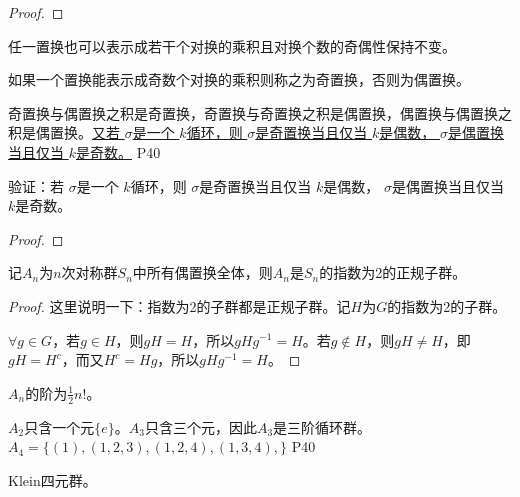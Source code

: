 \begin{proof}
	
\end{proof}

\begin{corollary}
	任一置换也可以表示成若干个对换的乘积且对换个数的奇偶性保持不变。
\end{corollary}

\begin{definition}
	如果一个置换能表示成奇数个对换的乘积则称之为奇置换，否则为偶置换。
\end{definition}

\original
{
	奇置换与偶置换之积是奇置换，奇置换与奇置换之积是偶置换，偶置换与偶置换之积是偶置换。\uline{又若 $\sigma$是一个 $k$循环，则 $\sigma$是奇置换当且仅当 $k$是偶数， $\sigma$是偶置换当且仅当 $k$是奇数。}
}
{P40}

\begin{proposition}
	验证：若 $\sigma$是一个 $k$循环，则 $\sigma$是奇置换当且仅当 $k$是偶数， $\sigma$是偶置换当且仅当 $k$是奇数。
\end{proposition}

\begin{proof}
	
\end{proof}

\begin{proposition}
	记$A_{n}$为$n$次对称群$S_{n}$中所有偶置换全体，则$A_{n}$是$S_{n}$的指数为2的正规子群。
\end{proposition}

\begin{proof}
	这里说明一下：指数为2的子群都是正规子群。记$H$为$G$的指数为2的子群。
	\par
	$\forall g\in G$，若$g\in H$，则$gH=H$，所以$gHg^{-1}=H$。若$g\not\in H$，则$gH\neq H$，即$gH=H^{c}$，而又$H^{c}=Hg$，所以$gHg^{-1}=H $。
\end{proof}

\begin{corollary}
	$A_{n}$的阶为$\frac{1}{2}n!$。
\end{corollary}


\original
{
	$A_{2}$只含一个元$\{e\}$。$A_{3}$只含三个元，因此$A_{3}$是三阶循环群。$A_{4}=\{(1),(1,2,3),(1,2,4),(1,3,4),\}$
}
{P40}

\begin{example}
	Klein四元群。
\end{example}

